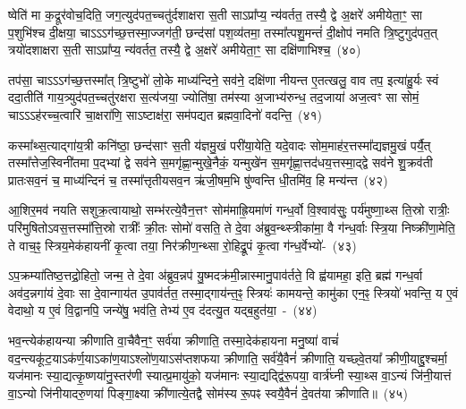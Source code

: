 ष्वेति॑ मा क॒द्रूर॑वोच॒दिति॒ जग॒त्युद॑पत॒च्चतु॑र्दशाक्षरा स॒ती सा\-ऽप्रा᳚प्य॒ न्य॑वर्तत॒ तस्यै॒ द्वे अ॒क्षरे॑ अमीयेता॒ꣳ॒ सा प॒शुभि॑श्च दी॒क्षया॒ चा\-ऽऽ\-ऽग॑च्छ॒त्तस्मा॒ज्जग॑ती॒ छन्द॑सां पश॒व्य॑तमा॒ तस्मा᳚त्पशु॒मन्तं॑ दी॒क्षोप॑ नमति त्रि॒ष्टुगुद॑पत॒त् त्रयो॑दशाक्षरा स॒ती सा\-ऽप्रा᳚प्य॒ न्य॑वर्तत॒ तस्यै॒ द्वे अ॒क्षरे॑ अमीयेता॒ꣳ॒ सा दक्षि॑णाभिश्च॒~(४०)\ip

तप॑सा॒ चा\-ऽऽ\-ऽग॑च्छ॒त्तस्मा᳚त् त्रि॒ष्टुभो॑ लो॒के माध्य॑न्दिने॒ सव॑ने॒ दक्षि॑णा नीयन्त ए॒तत्खलु॒ वाव तप॒ इत्या॑हु॒र्यः स्वं ददा॒तीति॑ गाय॒त्र्युद॑पत॒च्चतु॑रक्षरा स॒त्य॑जया॒ ज्योति॑षा॒ तम॑स्या अ॒जाभ्य॑रुन्ध॒ तद॒जाया॑ अज॒त्वꣳ सा सोमं॒ चा\-ऽऽ\-ऽह॑रच्च॒त्वारि॑ चा॒क्षरा॑णि॒ सा\-ऽष्टाक्ष॑रा॒ सम॑पद्यत ब्रह्मवा॒दिनो॑ वदन्ति॒~(४१)\ip

कस्मा᳚थ्स॒त्याद्गा॑य॒त्री कनि॑ष्ठा॒ छन्द॑साꣳ स॒ती य॑ज्ञमु॒खं परी॑या॒येति॒ यदे॒वादः सोम॒माह॑र॒त्तस्मा᳚द्\-यज्ञमु॒खं पर्यै॒त् तस्मा᳚त्तेज॒स्विनी॑तमा प॒द्भ्यां द्वे सव॑ने स॒मगृ॑ह्णा॒न्मुखे॒नैकं॒ यन्मुखे॑न स॒मगृ॑ह्णा॒त्तद॑धय॒त्तस्मा॒द्द्वे सव॑ने शु॒क्रव॑ती प्रातःसव॒नं च॒ माध्य॑न्दिनं च॒ तस्मा᳚त्तृतीय\-सव॒न ऋ॑जी॒षम॒भि षु॑ण्वन्ति धी॒तमि॑व॒ हि मन्य॑न्त~(४२)\ip

आ॒शिर॒मव॑ नयति सशुक्र॒त्वायाथो॒ सम्भ॑रत्ये॒वैन॒त्तꣳ सोम॑माह्रि॒यमा॑णं गन्ध॒र्वो वि॒श्वाव॑सुः॒ पर्य॑मुष्णा॒थ्स ति॒स्रो रात्रीः॒ परि॑मुषितो\-ऽवस॒त्तस्मा᳚त्ति॒स्रो रात्रीः᳚ क्री॒तः सोमो॑ वसति॒ ते दे॒वा अ॑ब्रुव॒न्थ्स्त्रीका॑मा॒ वै ग॑न्ध॒र्वाः स्त्रि॒या निष्क्री॑णा॒मेति॒ ते वाच॒ꣴ॒ स्त्रिय॒मेक॑हायनीं कृ॒त्वा तया॒ निर॑क्रीण॒न्थ्सा रो॒हिद्रू॒पं कृ॒त्वा ग॑न्ध॒र्वेभ्यो॑-~(४३)\ip

ऽप॒क्रम्या॑तिष्ठ॒त्तद्रो॒हितो॒ जन्म॒ ते दे॒वा अ॑ब्रुव॒न्नप॑ यु॒ष्मदक्र॑मी॒न्नास्मानु॒पाव॑र्तते॒ वि ह्व॑यामहा॒ इति॒ ब्रह्म॑ गन्ध॒र्वा अव॑द॒न्नगा॑यं दे॒वाः सा दे॒वान्गाय॑त उ॒पाव॑र्तत॒ तस्मा॒द्गाय॑न्त॒ꣴ॒ स्त्रियः॑ कामयन्ते॒ कामु॑का एन॒ꣴ॒ स्त्रियो॑ भवन्ति॒ य ए॒वं वेदाथो॒ य ए॒वं वि॒द्वानपि॒ जन्ये॑षु॒ भव॑ति॒ तेभ्य॑ ए॒व द॑दत्यु॒त यद्ब॒हुत॑या॒~-~(४४)\ip

भव॒न्त्येक॑हायन्या क्रीणाति वा॒चैवैन॒ꣳ॒ सर्व॑या क्रीणाति॒ तस्मा॒देक॑हायना मनु॒ष्या॑ वाचं॑ वद॒न्त्यकू॑ट॒या\-ऽक॑र्ण॒या\-ऽका॑ण॒या\-ऽश्लो॑ण॒या\-ऽस॑प्तशफया क्रीणाति॒ सर्व॑यै॒वैनं॑ क्रीणाति॒ यच्छ्वे॒तया᳚ क्रीणी॒याद्दु॒श्चर्मा॒ यज॑मानः स्या॒द्यत्कृ॒ष्णया॑नु॒स्तर॑णी स्यात्प्र॒मायु॑को॒ यज॑मानः स्या॒द्यद्द्वि॑रू॒पया॒ वार्त्र॑घ्नी स्या॒थ्स वा॒\-ऽन्यं जि॑नी॒यात्तं वा॒\-ऽन्यो जि॑नीयादरु॒णया॑ पिङ्गा॒क्ष्या क्री॑णात्ये॒तद्वै सोम॑स्य रू॒पꣴ स्वयै॒वैनं॑ दे॒वत॑या क्रीणाति॥~(४५)\ip

{\anuvakamend[{निष्क्री॑णीष्व॒ दक्षि॑णाभिश्च वदन्ति॒ मन्य॑न्ते गन्ध॒र्वेभ्यो॑ ब॒हुत॑याः पिङ्गा॒क्ष्या दश॑ च}]}

